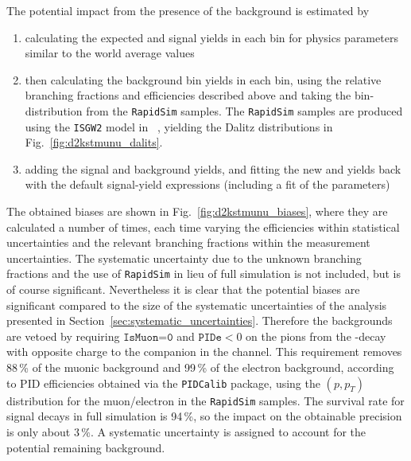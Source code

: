 The potential impact from the presence of the background is estimated by 
\begin{enumerate}
    \item calculating the expected \BtoDpi and \BtoDK signal yields in each bin for physics parameters similar to the world average values
    \item then calculating the background bin yields in each bin, using the relative branching fractions and efficiencies described above and taking the bin-distribution from the \texttt{RapidSim} samples. The \texttt{RapidSim} samples are produced using the \texttt{ISGW2} model in \evtgen~\cite{EvtGen}, yielding the Dalitz distributions in Fig.~\ref{fig:d2kstmunu_dalits}.
    \item adding the signal and background yields, and fitting the new \BtoDpi and \BtoDK yields back with the default signal-yield expressions (including a fit of the \Fi parameters)
\end{enumerate}
The obtained biases are shown in Fig.~\ref{fig:d2kstmunu_biases}, where they are calculated a number of times, each time varying the efficiencies within statistical uncertainties and the relevant branching fractions within the measurement uncertainties. The  systematic uncertainty due to the unknown branching fractions and the use of \texttt{RapidSim} in lieu of full simulation is not included, but is of course significant. Nevertheless it is clear that the potential biases are significant compared to the size of the systematic uncertainties of the analysis presented in Section~\ref{sec:systematic_uncertainties}. Therefore the backgrounds are vetoed by requiring $\texttt{IsMuon=0}$ and $\texttt{PIDe} < 0$ on the pions from the \D-decay with opposite charge to the companion in the \DtoKspipi channel. This requirement removes 88\,\% of the muonic background and 99\,\% of the electron background, according to PID efficiencies obtained via the  \texttt{PIDCalib} package, using the $(p, p_T)$ distribution for the muon/electron in the \texttt{RapidSim} samples. The survival rate for signal decays in full simulation is 94\,\%, so the impact on the obtainable precision is only about $3\,\%$. A systematic uncertainty is assigned to account for the potential remaining background.

